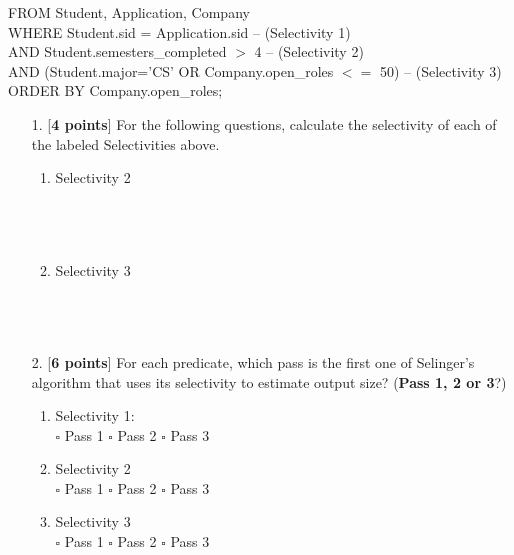 \documentclass[10pt]{article}
\begin{document}
FROM Student, Application, Company\\
WHERE Student.sid = Application.sid \hfill -- (Selectivity 1)\\
AND Student.semesters\_completed $>$ 4 \hfill -- (Selectivity 2)\\
AND (Student.major='CS' OR Company.open\_roles $<=$ 50) \hfill -- (Selectivity 3)\\
ORDER BY Company.open\_roles;
\begin{enumerate}
    \item[1.] [\textbf{4 points}] For the following questions, calculate the selectivity of each of the labeled Selectivities above.
        \begin{enumerate}
            \item Selectivity 2 \\ \\ \\ \\
            \item Selectivity 3 \\ \\ \\ \\
        \end{enumerate}
    \item[2.] [\textbf{6 points}] For each predicate, which pass is the first one of Selinger's algorithm that uses its selectivity to estimate output size? (\textbf{Pass 1, 2 or 3}?)
        \begin{enumerate}
            \item Selectivity 1: \\
                  $\square$ Pass 1 \quad $\square$ Pass 2 \quad $\square$ Pass 3 \\
            \item Selectivity 2 \\
                  $\square$ Pass 1 \quad $\square$ Pass 2 \quad $\square$ Pass 3 \\
            \item Selectivity 3 \\
                  $\square$ Pass 1 \quad $\square$ Pass 2 \quad $\square$ Pass 3 \\
        \end{enumerate}
\end{enumerate}
\end{document}
